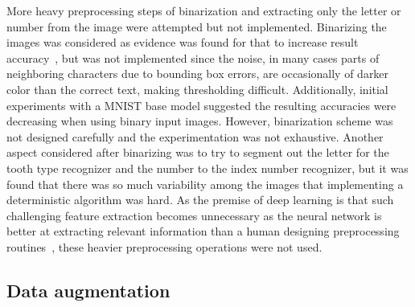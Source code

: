\documentclass[english,twoside,openright]{UH_DS_MSc}
\begin{document}
More heavy preprocessing steps of binarization and extracting only the letter or number from the image were 
attempted but not implemented.
Binarizing the images was considered as evidence was found for that to increase result accuracy~\cite{9thuonPalm},
but was not implemented since the noise, in many cases
 parts of neighboring characters due to bounding box errors, are occasionally of darker 
color than the correct text, making thresholding difficult. Additionally,
 initial experiments with a MNIST base model suggested the resulting
accuracies were decreasing when using binary input images. However, binarization scheme was not designed carefully 
and the experimentation was not exhaustive.
Another aspect considered after binarizing was to try to segment out the letter for the tooth type recognizer 
and the number to the index number recognizer, but it was found that there was so much variability 
among the images that implementing a deterministic algorithm was hard. 
As the premise of deep learning is that such challenging feature extraction becomes unnecessary as the neural 
network is better at extracting relevant information than a human designing preprocessing routines~\cite{princebook}, these 
heavier preprocessing operations were not used.

\subsection{Data augmentation}
\label{sect:aug}
\end{document}
